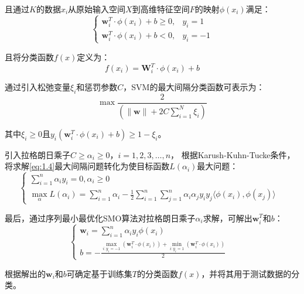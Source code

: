 且通过$K$的数据$x_i$从原始输入空间$X$到高维特征空间$F$的映射$\phi(x_i)$满足：
\begin{equation}\label{eq:1.2}
    \begin{cases}
        \boldsymbol{w}^T_i \cdot \phi(x_i) + b \geq 0, & y_i =1 \\
        \boldsymbol{w}^T_i \cdot \phi(x_i) + b < 0, & y_i =-1 
    \end{cases}
\end{equation}

且将分类函数$f(x)$定义为：
\begin{equation}\label{eq:1.3}
    f(x_i) = \boldsymbol{W}^T_i \cdot \phi(x_i) + b
\end{equation}

通过引入松弛变量$\xi_i$和惩罚参数$C$，SVM的最大间隔分类函数可表示为：
\begin{equation}\label{eq:1.4}
    \max \frac{2}{(\| \boldsymbol{w} \| + 2C \sum^N_{i=1} \xi_i)}
\end{equation}

其中$\xi_i \geq 0$且$ y_i (\boldsymbol{w}^T_i \cdot \phi(x_i) + b) \geq 1-\xi_i$。

引入拉格朗日乘子$C \geq \alpha_i \geq 0，i=1,2,3,\ldots,n$，
根据Karush-Kuhn-Tucke条件，将求解\autoref{eq:1.4}最大间隔问题转化为使目标函数$L(\alpha_i)$最大问题：
\begin{equation}\label{eq:1.5}
    \begin{cases}
        \sum^n_{i=1} \alpha_i y_i =0, \alpha_i \geq 0  &\\
        \max\limits_\alpha L(\alpha_i)= \sum^n_{i=1} \alpha_i - \frac 12 \sum^n_{i=1}\sum^n_{j=1} \alpha_i \alpha_j y_i y_j \langle\phi(x_i),\phi(x_j)\rangle & 
    \end{cases}
\end{equation}

最后，通过序列最小最优化SMO算法对拉格朗日乘子$\alpha_i$求解，可解出$\boldsymbol{w}^T_i$和$b$：
\begin{equation}\label{eq:1.6}
    \begin{cases}
        \boldsymbol{w}_i = \sum^n_{i=1} \alpha_i y_i \phi(x_i) & \\
        b=-\frac{\max\limits_{i \colon y_i = -1} (\boldsymbol{w}^T_i \cdot \phi(x_i) ) + \min\limits_{i \colon y_i = 1}(\boldsymbol{w}^T_i \cdot \phi(x_i) )}{2} & 
    \end{cases}
\end{equation}

根据解出的$\boldsymbol{w}_i$和$b$可确定基于训练集$T$的分类函数$f(x)$，并将其用于测试数据的分类。

